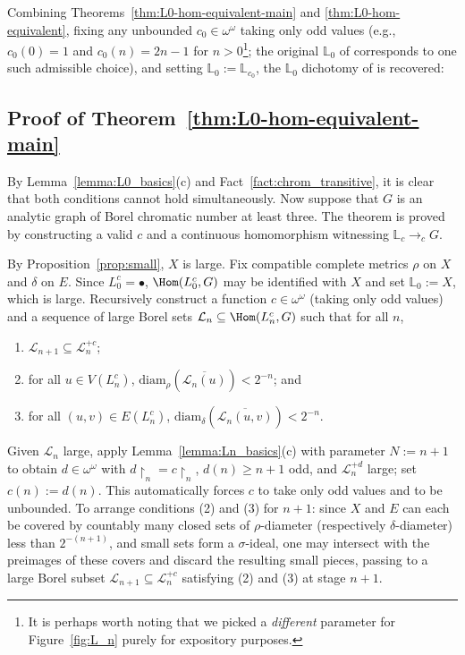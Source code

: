 Combining Theorems~\ref{thm:L0-hom-equivalent-main} and \ref{thm:L0-hom-equivalent}, fixing any unbounded $c_0\in\omega^\omega$ taking only odd values (e.g., $c_0(0)=1$ and $c_0(n)=2n-1$ for $n>0$\footnote{It is perhaps worth noting that we picked a \emph{different} parameter for Figure~\ref{fig:L_n} purely for expository purposes.}; the original $\mathbb{L}_0$ of \cite{L0paper} corresponds to one such admissible choice), and setting $\mathbb{L}_0:=\mathbb L_{c_0}$, the $\mathbb{L}_0$ dichotomy of \cite{L0paper} is recovered:

\Lzero*

\subsection{Proof of Theorem~\ref{thm:L0-hom-equivalent-main}}

By Lemma~\ref{lemma:L0_basics}(c) and Fact~\ref{fact:chrom_transitive}, it is clear that both conditions cannot hold simultaneously.
Now suppose that $G$ is an analytic graph of Borel chromatic number at least three.
The theorem is proved by constructing a valid $c$ and a continuous homomorphism witnessing $\mathbb L_c\to_cG$.

By Proposition~\ref{prop:small}, $X$ is large.
Fix compatible complete metrics $\rho$ on $X$ and $\delta$ on $E$.
Since $L^c_0=\bullet$, $\Hom(L^c_0,G)$ may be identified with $X$ and set $\mathbb{L}_0:=X$, which is large.
Recursively construct a function $c\in\omega^\omega$ (taking only odd values) and a sequence of large Borel sets $\mathcal L_n\subseteq\Hom(L^c_n, G)$ such that for all $n$,

\begin{enumerate}[label=(\arabic*)]
    \item $\mathcal L_{n+1}\subseteq\mathcal L_n^{+c}$;
    \item for all $u\in V(L^c_n)$, $\mathrm{diam}_\rho(\overline{\mathcal L_n(u)})< 2^{-n}$; and
    \item for all $(u,v)\in E(L^c_n)$, $\mathrm{diam}_\delta(\overline{\mathcal L_n(u,v)})< 2^{-n}$.
\end{enumerate}

Given $\mathcal L_n$ large, apply Lemma~\ref{lemma:Ln_basics}(c) with parameter $N:=n+1$ to obtain $d\in\omega^\omega$ with $d\restriction_n=c\restriction_n$, $d(n)\geq n+1$ odd, and $\mathcal L_n^{+d}$ large; set $c(n):=d(n)$.
This automatically forces $c$ to take only odd values and to be unbounded.
To arrange conditions (2) and (3) for $n+1$: since $X$ and $E$ can each be covered by countably many closed sets of $\rho$-diameter (respectively $\delta$-diameter) less than $2^{-(n+1)}$, and small sets form a $\sigma$-ideal, one may intersect with the preimages of these covers and discard the resulting small pieces, passing to a large Borel subset $\mathcal L_{n+1}\subseteq\mathcal L_n^{+c}$ satisfying (2) and (3) at stage $n+1$.


